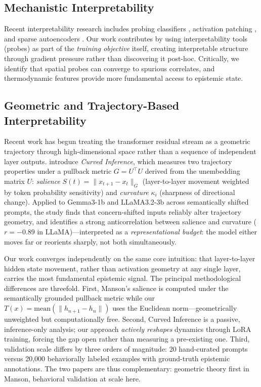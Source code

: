 \documentclass[11pt,a4paper]{article}
\begin{document}
\subsection{Mechanistic Interpretability}

Recent interpretability research includes probing classifiers \citep{belinkov2021probing}, activation patching \citep{meng2022locating}, and sparse autoencoders \citep{cunningham2023sparse}. Our work contributes by using interpretability tools (probes) as part of the \emph{training objective} itself, creating interpretable structure through gradient pressure rather than discovering it post-hoc. Critically, we identify that spatial probes can converge to spurious correlates, and thermodynamic features provide more fundamental access to epistemic state.

\subsection{Geometric and Trajectory-Based Interpretability}

Recent work has begun treating the transformer residual stream as a geometric trajectory through high-dimensional space rather than a sequence of independent layer outputs. \citet{manson2025curved} introduce \emph{Curved Inference}, which measures two trajectory properties under a pullback metric $G = U^\top U$ derived from the unembedding matrix $U$: \emph{salience} $S(t) = \|x_{t+1} - x_t\|_G$ (layer-to-layer movement weighted by token probability sensitivity) and \emph{curvature} $\kappa_i$ (sharpness of directional change). Applied to Gemma3-1b and LLaMA3.2-3b across semantically shifted prompts, the study finds that concern-shifted inputs reliably alter trajectory geometry, and identifies a strong anticorrelation between salience and curvature ($r = -0.89$ in LLaMA)---interpreted as a \emph{representational budget}: the model either moves far or reorients sharply, not both simultaneously.

Our work converges independently on the same core intuition: that layer-to-layer hidden state movement, rather than activation geometry at any single layer, carries the most fundamental epistemic signal. The principal methodological differences are threefold. First, Manson's salience is computed under the semantically grounded pullback metric while our $T(x) = \text{mean}(\|h_{n+1} - h_n\|)$ uses the Euclidean norm---geometrically unweighted but computationally free. Second, Curved Inference is a passive, inference-only analysis; our approach \emph{actively reshapes} dynamics through LoRA training, forcing the gap open rather than measuring a pre-existing one. Third, validation scale differs by three orders of magnitude: 20 hand-curated prompts versus 20,000 behaviorally labeled examples with ground-truth epistemic annotations. The two papers are thus complementary: geometric theory first in Manson, behavioral validation at scale here.
\end{document}
